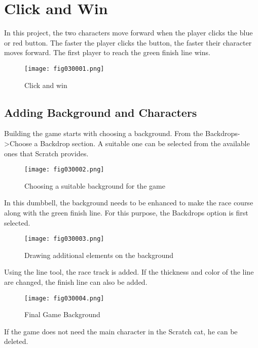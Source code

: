 \chapter{Click and Win}

In this project, the two characters move forward when the player clicks the blue or red button. The faster the player clicks the button, the faster their character moves forward. The first player to reach the green finish line wins.

\begin{figure}[H]
   \centering
   \texttt{[image: fig030001.png]}
   \caption{Click and win}
\label{fig030001}
\end{figure}

\section{Adding Background and Characters}

Building the game starts with choosing a background. From the Backdrops->Choose a Backdrop section. A suitable one can be selected from the available ones that Scratch provides.

\begin{figure}[H]
   \centering
   \texttt{[image: fig030002.png]}
   \caption{Choosing a suitable background for the game}
\label{fig030002}
\end{figure}

In this dumbbell, the background needs to be enhanced to make the race course along with the green finish line. For this purpose, the Backdrops option is first selected.

\begin{figure}[H]
   \centering
   \texttt{[image: fig030003.png]}
   \caption{Drawing additional elements on the background}
\label{fig030003}
\end{figure}

Using the line tool, the race track is added. If the thickness and color of the line are changed, the finish line can also be added.

\begin{figure}[H]
   \centering
   \texttt{[image: fig030004.png]}
   \caption{Final Game Background}
\label{fig030004}
\end{figure}

If the game does not need the main character in the Scratch cat, he can be deleted.

